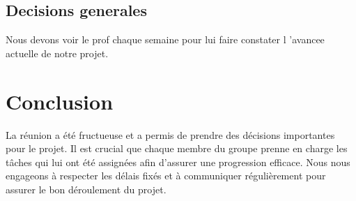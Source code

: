 \documentclass{article}
\begin{document}
\subsection{Decisions generales}
Nous devons voir le prof chaque semaine pour lui faire constater l 'avancee actuelle de notre projet.

\section{Conclusion}

La réunion a été fructueuse et a permis de prendre des décisions importantes pour le projet. Il est crucial que chaque membre du groupe prenne en charge les tâches qui lui ont été assignées afin d'assurer une progression efficace. Nous nous engageons à respecter les délais fixés et à communiquer régulièrement pour assurer le bon déroulement du projet.
\end{document}
